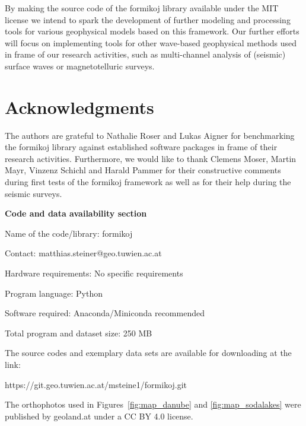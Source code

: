 \documentclass[a4paper,fleqn]{cas-sc}
\begin{document}
By making the source code of the formikoj library available under the MIT license we intend to spark the development of further modeling and processing tools for various geophysical models based on this framework. Our further efforts will focus on implementing tools for other wave-based geophysical methods used in frame of our research activities, such as multi-channel analysis of (seismic) surface waves or magnetotelluric surveys. 

\section{Acknowledgments}

The authors are grateful to Nathalie Roser and Lukas Aigner for benchmarking the formikoj library against established software packages in frame of their research activities. Furthermore, we would like to thank Clemens Moser, Martin Mayr, Vinzenz Schichl and Harald Pammer for their constructive comments during first tests of the formikoj framework as well as for their help during the seismic surveys.

\newpage

\textbf{Code and data availability section}

Name of the code/library: formikoj

Contact: matthias.steiner@geo.tuwien.ac.at

Hardware requirements: No specific requirements

Program language: Python
 
Software required: Anaconda/Miniconda recommended

Total program and dataset size: 250 MB

The source codes and exemplary data sets are available for downloading at the link:

https://git.geo.tuwien.ac.at/msteine1/formikoj.git

The orthophotos used in Figures~\ref{fig:map_danube} and \ref{fig:map_sodalakes} were published by geoland.at under a CC BY 4.0 license.

\appendix
\end{document}
